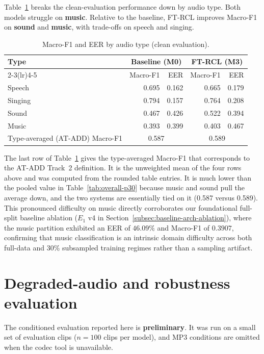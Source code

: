 Table~\ref{tab:type-p30} breaks the clean-evaluation performance down by audio type. Both models struggle on \textbf{music}. Relative to the baseline, FT-RCL improves Macro-F1 on \textbf{sound} and \textbf{music}, with trade-offs on speech and singing.

\begin{table}[htbp]
\centering
\caption{Macro-F1 and EER by audio type (clean evaluation).}
\label{tab:type-p30}
\small
\begin{tabular}{@{}lrrrr@{}}
\toprule
Type & \multicolumn{2}{c}{Baseline (M0)} & \multicolumn{2}{c}{FT-RCL (M3)} \\
\cmidrule(lr){2-3}\cmidrule(lr){4-5}
 & Macro-F1 & EER & Macro-F1 & EER \\
\midrule
Speech  & 0.695 & 0.162 & 0.665 & 0.179 \\
Singing & 0.794 & 0.157 & 0.764 & 0.208 \\
Sound   & 0.467 & 0.426 & 0.522 & 0.394 \\
Music   & 0.393 & 0.399 & 0.403 & 0.467 \\
\midrule
Type-averaged (AT-ADD) Macro-F1 & \multicolumn{2}{c}{0.587} & \multicolumn{2}{c}{0.589} \\
\bottomrule
\end{tabular}
\end{table}

The last row of Table~\ref{tab:type-p30} gives the type-averaged Macro-F1 that corresponds to the AT-ADD Track~2 definition. It is the unweighted mean of the four rows above and was computed from the rounded table entries. It is much lower than the pooled value in Table~\ref{tab:overall-p30} because music and sound pull the average down, and the two systems are essentially tied on it (0.587 versus 0.589). This pronounced difficulty on music directly corroborates our foundational full-split baseline ablation ($E_1$ v4 in Section~\ref{subsec:baseline-arch-ablation}), where the music partition exhibited an EER of $46.09\%$ and Macro-F1 of $0.3907$, confirming that music classification is an intrinsic domain difficulty across both full-data and 30\% subsampled training regimes rather than a sampling artifact.

\section{Degraded-audio and robustness evaluation}
\label{sec:degraded-eval}

The conditioned evaluation reported here is \textbf{preliminary}. It was run on a small set of evaluation clips ($n = 100$ clips per model), and MP3 conditions are omitted when the codec tool is unavailable.


